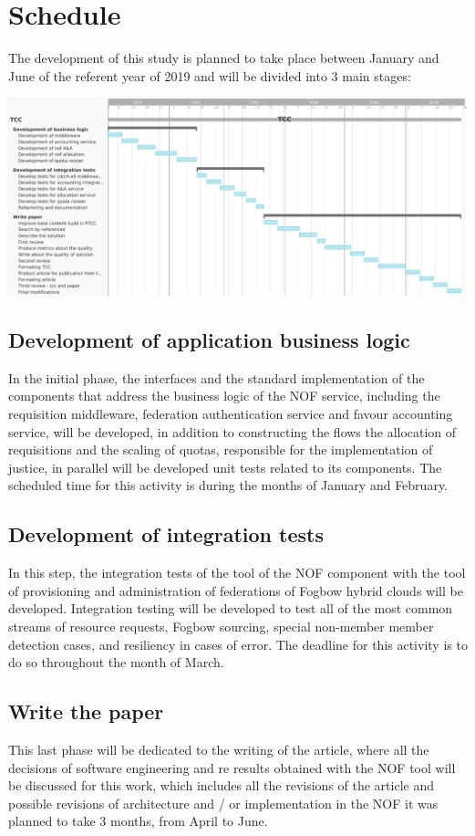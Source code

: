 \documentclass{article}
\begin{document}
\section{Schedule}

The development of this study is planned to take place between January and June of the referent year of 2019 and will be divided into 3 main stages:

\begin{center}
\includegraphics[scale=0.35]{./image/TCC-schedule.png}
\end{center}

\subsection{Development of application business logic}
	In the initial phase, the interfaces and the standard implementation of the components that address the business logic of the NOF service, including the requisition middleware, federation authentication service and favour accounting service, will be developed, in addition to constructing the flows the allocation of requisitions and the scaling of quotas, responsible for the implementation of justice, in parallel will be developed unit tests related to its components. The scheduled time for this activity is during the months of January and February.
\subsection{Development of integration tests}
    In this step, the integration tests of the tool of the NOF component with the tool of provisioning and administration of federations of Fogbow hybrid clouds will be developed. Integration testing will be developed to test all of the most common streams of resource requests, Fogbow sourcing, special non-member member detection cases, and resiliency in cases of error. The deadline for this activity is to do so throughout the month of March.
\subsection{Write the paper}
    This last phase will be dedicated to the writing of the article, where all the decisions of software engineering and re results obtained with the NOF tool will be discussed for this work, which includes all the revisions of the article and possible revisions of architecture and / or implementation in the NOF it was planned to take 3 months, from April to June.
    
\end{document}
